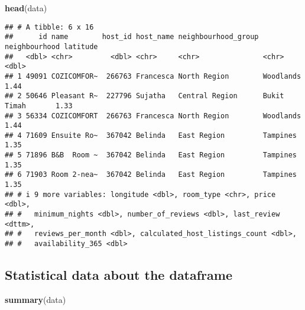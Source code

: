 \documentclass[
]{article}
\newenvironment{Shaded}{\begin{snugshade}}{\end{snugshade}}
\newcommand{\FunctionTok}[1]{\textcolor[rgb]{0.13,0.29,0.53}{\textbf{#1}}}
\newcommand{\NormalTok}[1]{#1}
\begin{document}
\begin{Shaded}
\begin{Highlighting}[]
\FunctionTok{head}\NormalTok{(data)}
\end{Highlighting}
\end{Shaded}

\begin{verbatim}
## # A tibble: 6 x 16
##      id name        host_id host_name neighbourhood_group neighbourhood latitude
##   <dbl> <chr>         <dbl> <chr>     <chr>               <chr>            <dbl>
## 1 49091 COZICOMFOR~  266763 Francesca North Region        Woodlands         1.44
## 2 50646 Pleasant R~  227796 Sujatha   Central Region      Bukit Timah       1.33
## 3 56334 COZICOMFORT  266763 Francesca North Region        Woodlands         1.44
## 4 71609 Ensuite Ro~  367042 Belinda   East Region         Tampines          1.35
## 5 71896 B&B  Room ~  367042 Belinda   East Region         Tampines          1.35
## 6 71903 Room 2-nea~  367042 Belinda   East Region         Tampines          1.35
## # i 9 more variables: longitude <dbl>, room_type <chr>, price <dbl>,
## #   minimum_nights <dbl>, number_of_reviews <dbl>, last_review <dttm>,
## #   reviews_per_month <dbl>, calculated_host_listings_count <dbl>,
## #   availability_365 <dbl>
\end{verbatim}

\hypertarget{statistical-data-about-the-dataframe}{%
\subsection{Statistical data about the
dataframe}\label{statistical-data-about-the-dataframe}}

\begin{Shaded}
\begin{Highlighting}[]
\FunctionTok{summary}\NormalTok{(data)}
\end{Highlighting}
\end{Shaded}
\end{document}
